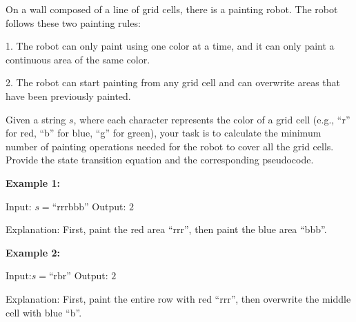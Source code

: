 \problem{}
On a wall composed of a line of grid cells, there is a painting robot. The robot follows these two painting rules:

1. The robot can only paint using one color at a time, and it can only paint a continuous area of the same color.

2. The robot can start painting from any grid cell and can overwrite areas that have been previously painted.

Given a string \(s\), where each character represents the color of a grid cell (e.g., “r” for red, “b” for blue, “g” for green), your task is to calculate the minimum number of painting operations needed for the robot to cover all the grid cells. Provide the state transition equation and the corresponding pseudocode.

\textbf{Example 1:}

Input: \(s = \text{“rrrbbb”}\)  Output: \(2\)

Explanation: First, paint the red area  “rrr”, then paint the blue area “bbb”.

\textbf{Example 2:}

Input:\(s = \text{“rbr”}\)  
Output: \(2\)

Explanation: First, paint the entire row with red “rrr”, then overwrite the middle cell with blue “b”.

\solution{
}
\newpage